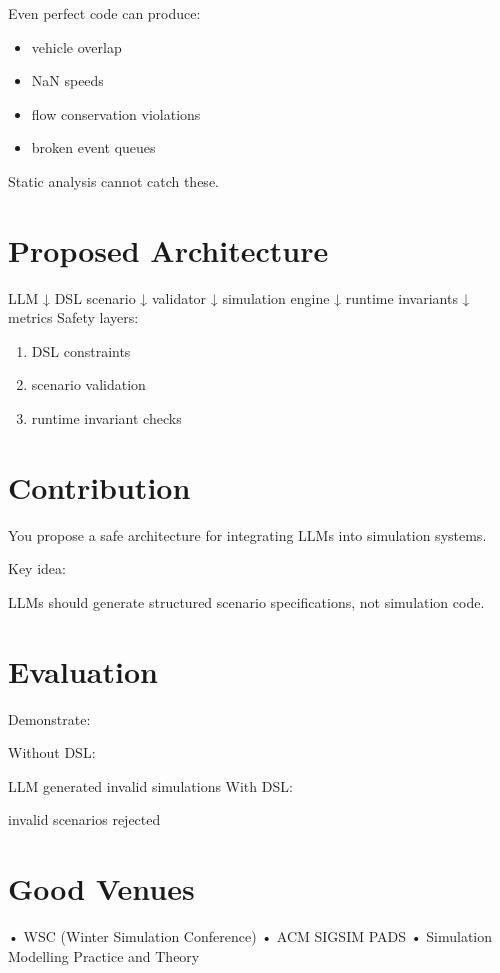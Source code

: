 Even perfect code can produce:

\begin{itemize}
\item vehicle overlap


\item NaN speeds


\item flow conservation violations


\item broken event queues


\end{itemize}
Static analysis cannot catch these.

\section*{Proposed Architecture}
LLM
↓
DSL scenario
↓
validator
↓
simulation engine
↓
runtime invariants
↓
metrics
Safety layers:

\begin{enumerate}
\item DSL constraints


\item scenario validation


\item runtime invariant checks


\end{enumerate}
\section*{Contribution}
You propose a safe architecture for integrating LLMs into simulation systems.

Key idea:

LLMs should generate structured scenario specifications, not simulation code.

\section*{Evaluation}
Demonstrate:

Without DSL:

LLM generated invalid simulations
With DSL:

invalid scenarios rejected
\section*{Good Venues}
• WSC (Winter Simulation Conference)
• ACM SIGSIM PADS
• Simulation Modelling Practice and Theory

